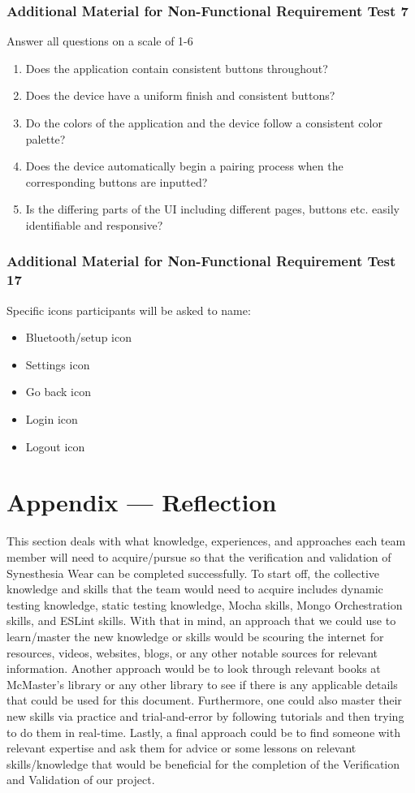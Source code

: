 \documentclass[12pt, titlepage]{article}
\begin{document}
\subsubsection{Additional Material for Non-Functional Requirement Test 7}
\noindent Answer all questions on a scale of 1-6 
\begin{enumerate}
  \item Does the application contain consistent buttons throughout?
  \item Does the device have a uniform finish and consistent buttons?
  \item Do the colors of the application and the device follow a consistent color palette?
  \item Does the device automatically begin a pairing process when the corresponding buttons are inputted?
  \item Is the differing parts of the UI including different pages, buttons etc. easily identifiable and responsive? 
\end{enumerate}

\subsubsection{Additional Material for Non-Functional Requirement Test 17}
\noindent Specific icons participants will be asked to name:
\begin{itemize}
  \item Bluetooth/setup icon
  \item Settings icon
  \item Go back icon
  \item Login icon
  \item Logout icon
\end{itemize}


\newpage{}
\section*{Appendix --- Reflection}
This section deals with what knowledge, experiences, and approaches each team member will need to acquire/pursue so that the verification and validation of Synesthesia Wear can be completed successfully.
To start off, the collective knowledge and skills that the team would need to acquire includes dynamic testing knowledge, static testing knowledge, Mocha skills, Mongo Orchestration skills, and ESLint skills.
With that in mind, an approach that we could use to learn/master the new knowledge or skills would be scouring the internet for resources, videos, websites, blogs, or any other notable sources for relevant information.
Another approach would be to look through relevant books at McMaster's library or any other library to see if there is any applicable details that could be used for this document.
Furthermore, one could also master their new skills via practice and trial-and-error by following tutorials and then trying to do them in real-time.
Lastly, a final approach could be to find someone with relevant expertise and ask them for advice or some lessons on relevant skills/knowledge that would be beneficial for the completion of the Verification and Validation of our project.
\end{document}
